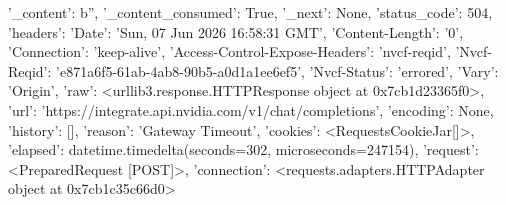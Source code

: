 
{'_content': b'', '_content_consumed': True, '_next': None, 'status_code': 504, 'headers': {'Date': 'Sun, 07 Jun 2026 16:58:31 GMT', 'Content-Length': '0', 'Connection': 'keep-alive', 'Access-Control-Expose-Headers': 'nvcf-reqid', 'Nvcf-Reqid': 'e871a6f5-61ab-4ab8-90b5-a0d1a1ee6ef5', 'Nvcf-Status': 'errored', 'Vary': 'Origin'}, 'raw': <urllib3.response.HTTPResponse object at 0x7cb1d23365f0>, 'url': 'https://integrate.api.nvidia.com/v1/chat/completions', 'encoding': None, 'history': [], 'reason': 'Gateway Timeout', 'cookies': <RequestsCookieJar[]>, 'elapsed': datetime.timedelta(seconds=302, microseconds=247154), 'request': <PreparedRequest [POST]>, 'connection': <requests.adapters.HTTPAdapter object at 0x7cb1c35c66d0>}
